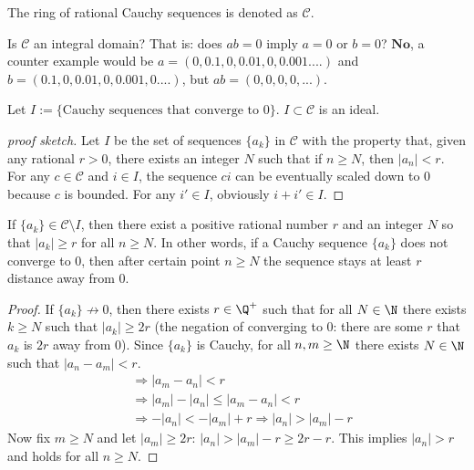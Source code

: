 \documentclass[10pt]{article}
\begin{document}
\begin{notation}
    The ring of rational Cauchy sequences is denoted as $\mathcal{C}$.
\end{notation}
\begin{remark}
    Is $\mathcal{C}$ an integral domain? That is: does $ab=0$ imply $a=0$ or $b=0$? $\textbf{No}$, a counter example would be $a= (0,0.1,0,0.01,0,0.001....)$ and $b= (0.1,0,0.01,0,0.001,0....)$, but $ab = (0,0,0,0,...)$.
\end{remark}
\begin{proposition}
    Let $I := \{\text{Cauchy sequences that converge to }0\}$. $I\subset \mathcal C$ is an ideal.
\end{proposition}
\begin{proof}[proof sketch]
    Let $I$ be the set of sequences $\{a_k\}$ in $\mathcal C$ with the property that, given any rational $r > 0$, there exists an integer $N$ such that if $n \geq N$, then $|a_n| < r$. For any $c\in \mathcal{C}$ and $i\in I$, the sequence $ci$ can be eventually scaled down to 0 because $c$ is bounded. For any $i'\in I$, obviously $i+i'\in I$.
\end{proof}
\begin{proposition}
    If $\{a_k\}\in \mathcal{C} \setminus I$, then there exist a positive rational number $r$ and an integer $N$ so that $|a_k|\geq r$ for all $n\geq N$. In other words, if a Cauchy sequence $\{a_k\}$ does not converge to 0, then after certain point $n\geq N$ the sequence stays at least $r$ distance away from 0.
\end{proposition}
\begin{proof}
    If $\{a_k\}\nrightarrow 0$, then there exists $ r \in \Q^+$ such that for all $ N \in \N$ there exists $ k\geq N$ such that $|a_k| \geq 2r$ (the negation of converging to 0: there are some $r$ that $a_k$ is $2r$ away from 0). Since $\{a_k\}$ is Cauchy, for all $n, m \geq \N$ there exists $N \in \N$ such that $|a_n - a_m| < r$.
    \begin{align*}
        &\Rightarrow |a_m - a_n| < r\tag{ property of absolute value}\\
        &\Rightarrow |a_m|-|a_n|\leq |a_m - a_n| < r\tag{reverse triangle inequality}\\
        &\Rightarrow -|a_n|<-|a_m|+r \Rightarrow |a_n|>|a_m|-r
    \end{align*}
    Now fix $m \geq N$ and let $|a_m|\geq 2r$: $|a_n|>|a_m|-r\geq 2r-r$. This implies $|a_n|>r$ and holds for all $n\geq N$.
\end{proof}
\end{document}
